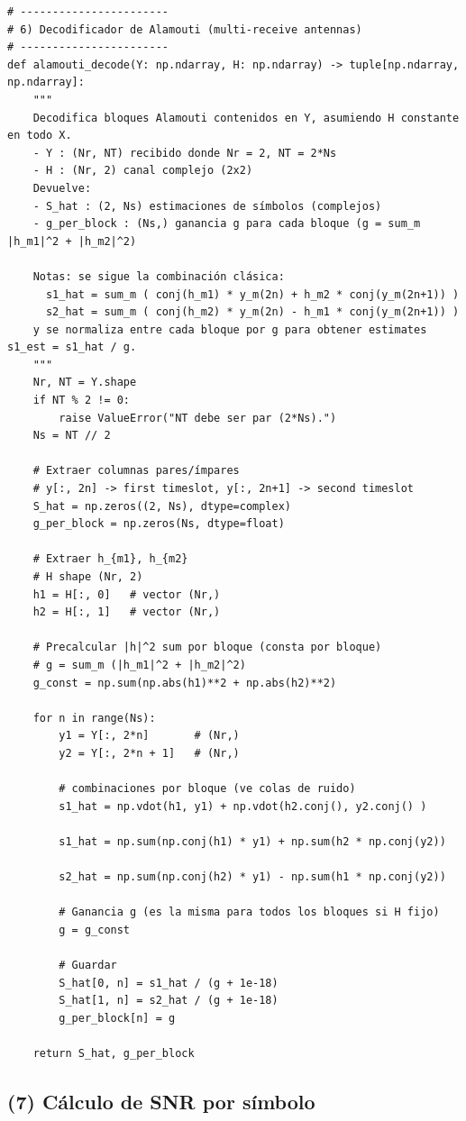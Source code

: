 \documentclass[11pt]{article}
\begin{document}
\begin{verbatim}
# -----------------------
# 6) Decodificador de Alamouti (multi-receive antennas)
# -----------------------
def alamouti_decode(Y: np.ndarray, H: np.ndarray) -> tuple[np.ndarray, np.ndarray]:
    """
    Decodifica bloques Alamouti contenidos en Y, asumiendo H constante en todo X.
    - Y : (Nr, NT) recibido donde Nr = 2, NT = 2*Ns
    - H : (Nr, 2) canal complejo (2x2)
    Devuelve:
    - S_hat : (2, Ns) estimaciones de símbolos (complejos)
    - g_per_block : (Ns,) ganancia g para cada bloque (g = sum_m |h_m1|^2 + |h_m2|^2)

    Notas: se sigue la combinación clásica:
      s1_hat = sum_m ( conj(h_m1) * y_m(2n) + h_m2 * conj(y_m(2n+1)) )
      s2_hat = sum_m ( conj(h_m2) * y_m(2n) - h_m1 * conj(y_m(2n+1)) )
    y se normaliza entre cada bloque por g para obtener estimates s1_est = s1_hat / g.
    """
    Nr, NT = Y.shape
    if NT % 2 != 0:
        raise ValueError("NT debe ser par (2*Ns).")
    Ns = NT // 2

    # Extraer columnas pares/ímpares
    # y[:, 2n] -> first timeslot, y[:, 2n+1] -> second timeslot
    S_hat = np.zeros((2, Ns), dtype=complex)
    g_per_block = np.zeros(Ns, dtype=float)

    # Extraer h_{m1}, h_{m2}
    # H shape (Nr, 2)
    h1 = H[:, 0]   # vector (Nr,)
    h2 = H[:, 1]   # vector (Nr,)

    # Precalcular |h|^2 sum por bloque (consta por bloque)
    # g = sum_m (|h_m1|^2 + |h_m2|^2)
    g_const = np.sum(np.abs(h1)**2 + np.abs(h2)**2)

    for n in range(Ns):
        y1 = Y[:, 2*n]       # (Nr,)
        y2 = Y[:, 2*n + 1]   # (Nr,)

        # combinaciones por bloque (ve colas de ruido)
        s1_hat = np.vdot(h1, y1) + np.vdot(h2.conj(), y2.conj() )

        s1_hat = np.sum(np.conj(h1) * y1) + np.sum(h2 * np.conj(y2))

        s2_hat = np.sum(np.conj(h2) * y1) - np.sum(h1 * np.conj(y2))

        # Ganancia g (es la misma para todos los bloques si H fijo)
        g = g_const

        # Guardar
        S_hat[0, n] = s1_hat / (g + 1e-18)
        S_hat[1, n] = s2_hat / (g + 1e-18)
        g_per_block[n] = g

    return S_hat, g_per_block
\end{verbatim}

\subsection*{(7) Cálculo de SNR por símbolo}
\end{document}
